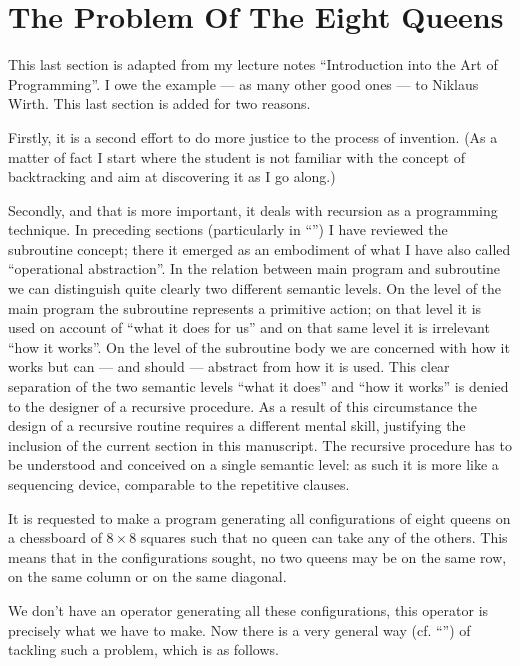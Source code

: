 \section[The problem of the eight queens]{The Problem Of The Eight Queens}

This last section is adapted from my lecture notes ``Introduction into the Art of Programming''. I owe the example --- as many other good ones --- to Niklaus Wirth. This last section is added for two reasons.

Firstly, it is a second effort to do more justice to the process of invention. (As a matter of fact I start where the student is not familiar with the concept of backtracking and aim at discovering it as I go along.)

Secondly, and that is more important, it deals with recursion as a programming technique. In preceding sections (particularly in ``'') I have reviewed the subroutine concept; there it emerged as an embodiment of what I have also called ``operational abstraction''. In the relation between main program and subroutine we can distinguish quite clearly two different semantic levels. On the level of the main program the subroutine represents a primitive action; on that level it is used on account of ``what it does for us'' and on that same level it is irrelevant ``how it works''. On the level of the subroutine body we are concerned with how it works but can --- and should --- abstract from how it is used. This clear separation of the two semantic levels ``what it does'' and ``how it works'' is denied to the designer of a recursive procedure. As a result of this circumstance the design of a recursive routine requires a different mental skill, justifying the inclusion of the current section in this manuscript. The recursive procedure has to be understood and conceived on a single semantic level: as such it is more like a sequencing device, comparable to the repetitive clauses.

It is requested to make a program generating all configurations of eight queens on a chessboard of $8\times 8$ squares such that no queen can take any of the others. This means that in the configurations sought, no two queens may be on the same row, on the same column or on the same diagonal.

We don't have an operator generating all these configurations, this operator is precisely what we have to make. Now there is a very general way (cf. ``'') of tackling such a problem, which is as follows.

